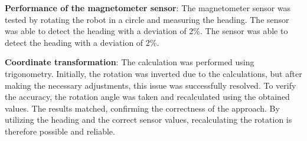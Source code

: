 \textbf{Performance of the magnetometer sensor}:
The magnetometer sensor was tested by rotating the robot in a circle and measuring the heading.
The sensor was able to detect the heading with a deviation of 2\%. The sensor was able to detect the heading with a deviation of 2\%.

\textbf{Coordinate transformation}:
The calculation was performed using trigonometry. Initially, the rotation was inverted due to the calculations, but after making the necessary adjustments, this issue was successfully resolved.
To verify the accuracy, the rotation angle was taken and recalculated using the obtained values. The results matched, confirming the correctness of the approach.
By utilizing the heading and the correct sensor values, recalculating the rotation is therefore possible and reliable.